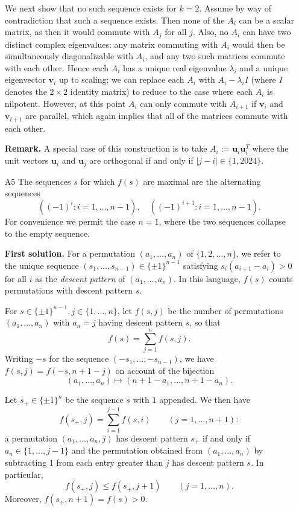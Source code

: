 \documentclass[amssymb,twocolumn,pra,10pt,aps]{revtex4-1}
\begin{document}
\begin{itemize}
We next show that no such sequence exists for $k=2$. 
Assume by way of contradiction that such a sequence exists. Then none of the $A_i$ can be a scalar matrix, as then it would commute with $A_{j}$ for all $j$. Also, no $A_i$ can have two distinct complex eigenvalues: any matrix commuting with $A_i$ would then be simultaneously diagonalizable with $A_i$, and any two such matrices commute with each other. Hence each $A_i$ has a unique real eigenvalue $\lambda_i$ and a unique eigenvector $\mathbf{v}_i$ up to scaling; we can replace each $A_i$ with $A_i - \lambda_i I$ (where $I$ denotes the $2 \times 2$ identity matrix) to reduce to the case where each $A_i$ is nilpotent. However, at this point $A_i$ can only commute with $A_{i+1}$ if $\mathbf{v}_i$ and $\mathbf{v}_{i+1}$ are parallel, which again implies that all of the matrices commute with each other.

\noindent
\textbf{Remark.}
A special case of this construction is to take $A_i := \mathbf{u}_i \mathbf{u}_i^T$ where the unit vectors $\mathbf{u}_i$ and $\mathbf{u}_j$ are orthogonal if and only if $|j-i| \in \{1,2024\}$.

\item[A5]
The sequences $s$ for which $f(s)$ are maximal are the alternating sequences
\[
((-1)^i \colon i=1,\dots,n-1), \quad
((-1)^{i+1} \colon i=1,\dots,n-1).
\]
For convenience we permit the case $n=1$, where the two sequences collapse to the empty sequence.

\noindent
\textbf{First solution.}
For a permutation $(a_1,\dots,a_n)$ of $\{1,2,\dots,n\}$, we refer to the unique sequence
$(s_1,\dots,s_{n-1}) \in \{\pm 1\}^{n-1}$ satisfying $s_i(a_{i+1}-a_i) > 0$ for all $i$
as the \emph{descent pattern} of $(a_1,\dots,a_n)$. In this language, $f(s)$ counts permutations with descent pattern $s$. 

For $s \in \{\pm 1\}^{n-1}, j \in \{1,\dots,n\}$, let $f(s,j)$ be the number of permutations
$(a_1,\dots,a_{n})$ with $a_{n} = j$ having descent pattern $s$, so that
\[
f(s) = \sum_{j=1}^n f(s,j).
\]
Writing $-s$ for the sequence $(-s_1,\dots,-s_{n-1})$, we have $f(s,j) = f(-s,n+1-j)$
on account of the bijection
\[
(a_1,\dots,a_n) \mapsto (n+1-a_1,\dots,n+1-a_n).
\]

Let $s_+ \in \{\pm 1\}^{n}$ be the sequence $s$ with $1$ appended.
We then have
\[
f(s_+, j) = \sum_{i=1}^{j-1} f(s, i) \qquad (j=1,\dots,n+1):
\]
a permutation $(a_1,\dots,a_n,j)$ has descent pattern $s_+$ if and only if $a_n \in \{1,\dots,j-1\}$
and the permutation obtained from $(a_1,\dots,a_n)$ by subtracting 1 from each entry greater than $j$ has descent pattern $s$. 
In particular,
\[
f(s_+, j) \leq f(s_+, j+1) \qquad (j=1,\dots,n).
\]
Moreover, $f(s_+, n+1) = f(s) > 0$.


\end{itemize}
\end{document}
